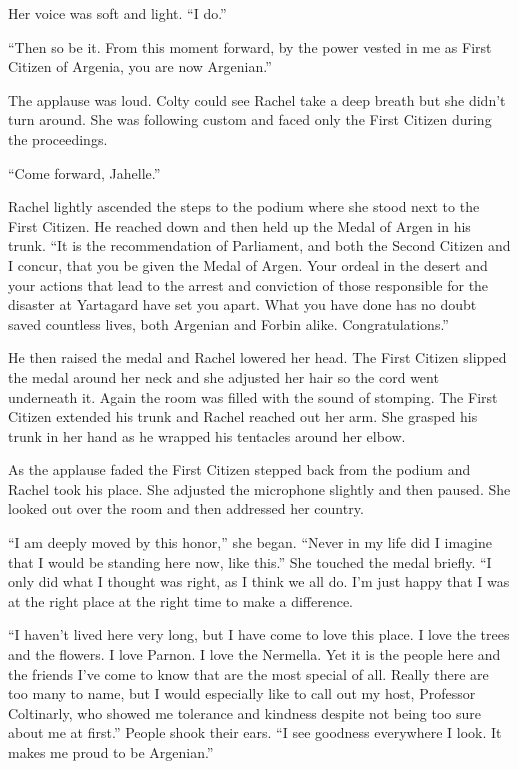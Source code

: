 Her voice was soft and light. ``I do.''

``Then so be it. From this moment forward, by the power vested in me as First Citizen of
Argenia, you are now Argenian.''


The applause was loud. Colty could see Rachel take a deep breath but she didn't turn around. She
was following custom and faced only the First Citizen during the proceedings.

``Come forward, Jahelle.''

Rachel lightly ascended the steps to the podium where she stood next to the First Citizen. He
reached down and then held up the Medal of Argen in his trunk. ``It is the recommendation of
Parliament, and both the Second Citizen and I concur, that you be given the Medal of Argen.
Your ordeal in the desert and your actions that lead to the arrest and conviction of those
responsible for the disaster at Yartagard have set you apart. What you have done has no doubt
saved countless lives, both Argenian and Forbin alike. Congratulations.''

He then raised the medal and Rachel lowered her head. The First Citizen slipped the medal around
her neck and she adjusted her hair so the cord went underneath it. Again the room was filled
with the sound of stomping. The First Citizen extended his trunk and Rachel reached out her arm.
She grasped his trunk in her hand as he wrapped his tentacles around her elbow.

As the applause faded the First Citizen stepped back from the podium and Rachel took his place.
She adjusted the microphone slightly and then paused. She looked out over the room and then
addressed her country.

``I am deeply moved by this honor,'' she began. ``Never in my life did I imagine that I would be
standing here now, like this.'' She touched the medal briefly. ``I only did what I thought was
right, as I think we all do. I'm just happy that I was at the right place at the right time to
make a difference.

``I haven't lived here very long, but I have come to love this place. I love the trees and the
flowers. I love Parnon. I love the Nermella. Yet it is the people here and the friends I've come
to know that are the most special of all. Really there are too many to name, but I would
especially like to call out my host, Professor Coltinarly, who showed me tolerance and kindness
despite not being too sure about me at first.'' People shook their ears. ``I see goodness
everywhere I look. It makes me proud to be Argenian.''

